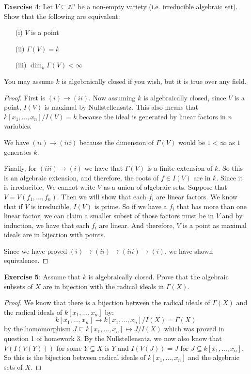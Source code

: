 \documentclass{article}
\begin{document}
\textbf{Exercise 4}: Let $V \subseteq \mathbb{A}^{n}$ be a non-empty variety (i.e. irreducible algebraic set). Show that the following are equivalent:
    \begin{itemize}
        \item [(i)] $V$ is a point

        \item [(ii)] $\Gamma(V) = k$

        \item [(iii)] $\mathop{dim}_{k}\Gamma(V) < \infty$ 
    \end{itemize}
You may assume $k$ is algebraically closed if you wish, but it is true over any field.
    \begin{proof}
        First is $(i) \rightarrow (ii)$. Now assuming $k$ is algebraically closed, since $V$ is a point, $I(V)$ is maximal by Nullstellensatz. This also means that $k[x_{1}, \ldots , x_{n}]/I(V) = k$ because the ideal is generated by linear factors in $n$ variables.

        We have $(ii) \rightarrow (iii)$ because the dimension of $\Gamma(V)$ would be $1 < \infty$ as $1$ generates $k$. 

        Finally, for $(iii) \rightarrow (i)$ we have that $\Gamma(V)$ is a finite extension of $k$. So this is an algebraic extension, and therefore, the roots of $f \in I(V)$ are in $k$. Since it is irreducible, We cannot write $V$ as a union of algebraic sets. Suppose that $V = V(f_{1}, \ldots , f_{n})$. Then we will show that each $f_{i}$ are linear factors. We know that if $V$ is irreducible, $I(V)$ is prime. So if we have a $f_{i}$ that has more than one linear factor, we can claim a smaller subset of those factors must be in $V$ and by induction, we have that each $f_{i}$ are linear. And therefore, $V$ is a point as maximal ideals are in bijection with points.

        Since we have proved $(i) \rightarrow (ii) \rightarrow (iii) \rightarrow (i)$, we have shown equivalence.
    \end{proof}

\textbf{Exercise 5}: Assume that $k$ is algebraically closed. Prove that the algebraic subsets of $X$ are in bijection with the radical ideals in $\Gamma(X)$.
    \begin{proof}
        We know that there is a bijection between the radical ideals of $\Gamma(X)$ and the radical ideals of $k[x_{1}, \ldots , x_{n}]$ by:
            \begin{equation*}
                k[x_{1}, \ldots , x_{n}] \rightarrow k[x_{1},\ldots ,x_{n}]/I(X) = \Gamma(X)
            \end{equation*}
        by the homomorphism $J \subseteq k[x_{1}, \ldots , x_{n}] \mapsto J/I(X)$ which was proved in question 1 of homework 3. By the Nullstellensatz, we now also know that $V(I(V(Y)))$ for some $Y \subseteq X$ is $Y$ and $I(V(J)) = J$ for $J \subseteq k[x_{1}, \ldots , x_{n}]$. So this is the bijection between radical ideals of $k[x_{1}, \ldots , x_{n}]$ and the algebraic sets of $X$.
    \end{proof}
\end{document}
